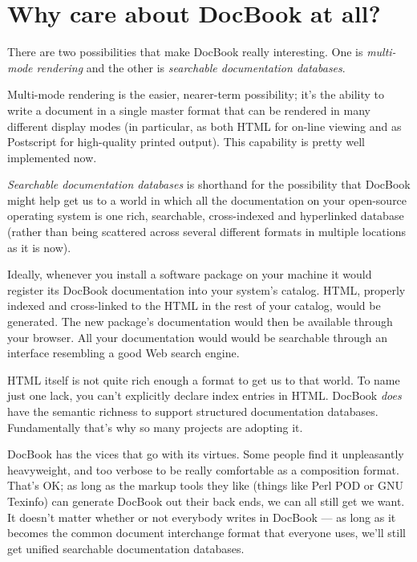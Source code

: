 \documentclass[pdftex,english,a4paper,10pt]{infocom}
\begin{document}
\section{Why care about DocBook at all?}
\label{id2718555}\hypertarget{id2718555}{}%

There are two possibilities that make DocBook really
interesting.  One is {\em multi-mode rendering} and the
other is {\em searchable documentation
databases}.

Multi-mode rendering is the easier, nearer-term possibility; it's
the ability to write a document in a single master format that can be
rendered in many different display modes (in particular, as both HTML
for on-line viewing and as Postscript for high-quality printed
output).  This capability is pretty well implemented now.

{\em Searchable documentation databases} is
shorthand for the possibility that DocBook might help get us to a
world in which all the documentation on your open-source operating
system is one rich, searchable, cross-indexed and hyperlinked
database (rather than being scattered across several different formats
in multiple locations as it is now).

Ideally, whenever you install a software package on your machine 
it would register its DocBook documentation into your system's
catalog.  HTML, properly indexed and cross-linked to the HTML in the 
rest of your catalog, would be generated.  The new package's
documentation would then be available through your browser.  All
your documentation would would be searchable through an interface
resembling a good Web search engine.

HTML itself is not quite rich enough a format to get us to that
world.  To name just one lack, you can't explicitly declare index
entries in HTML.  DocBook {\em does} have the semantic
richness to support structured documentation databases.  Fundamentally
that's why so many projects are adopting it.

DocBook has the vices that go with its virtues.  Some people
find it unpleasantly heavyweight, and too verbose to be really
comfortable as a composition format.  That's OK; as long as the markup
tools they like (things like Perl POD or GNU Texinfo) can generate
DocBook out their back ends, we can all still get we want.  It doesn't
matter whether or not everybody writes in DocBook --- as long as
it becomes the common document interchange format that everyone uses,
we'll still get unified searchable documentation databases.
\end{document}
